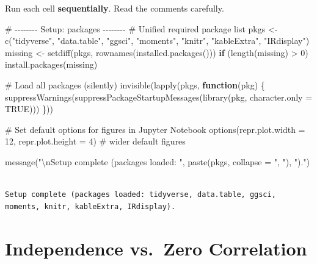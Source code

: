 \documentclass[
  12pt,
  a4paper,
]{scrbook}
\newenvironment{Shaded}{\begin{snugshade}}{\end{snugshade}}
\newcommand{\AttributeTok}[1]{\textcolor[rgb]{0.40,0.45,0.13}{#1}}
\newcommand{\CommentTok}[1]{\textcolor[rgb]{0.37,0.37,0.37}{#1}}
\newcommand{\ConstantTok}[1]{\textcolor[rgb]{0.56,0.35,0.01}{#1}}
\newcommand{\ControlFlowTok}[1]{\textcolor[rgb]{0.00,0.23,0.31}{\textbf{#1}}}
\newcommand{\DecValTok}[1]{\textcolor[rgb]{0.68,0.00,0.00}{#1}}
\newcommand{\FunctionTok}[1]{\textcolor[rgb]{0.28,0.35,0.67}{#1}}
\newcommand{\NormalTok}[1]{\textcolor[rgb]{0.00,0.23,0.31}{#1}}
\newcommand{\OtherTok}[1]{\textcolor[rgb]{0.00,0.23,0.31}{#1}}
\newcommand{\SpecialCharTok}[1]{\textcolor[rgb]{0.37,0.37,0.37}{#1}}
\newcommand{\StringTok}[1]{\textcolor[rgb]{0.13,0.47,0.30}{#1}}
\theoremstyle{plain}
\theoremstyle{definition}
\theoremstyle{remark}
\begin{document}
Run each cell \textbf{sequentially}. Read the comments carefully.

\begin{Shaded}
\begin{Highlighting}[]
\CommentTok{\# {-}{-}{-}{-}{-}{-}{-}{-} Setup: packages {-}{-}{-}{-}{-}{-}{-}{-}}
\CommentTok{\# Unified required package list}
\NormalTok{pkgs }\OtherTok{\textless{}{-}} \FunctionTok{c}\NormalTok{(}\StringTok{"tidyverse"}\NormalTok{, }\StringTok{"data.table"}\NormalTok{, }\StringTok{"ggsci"}\NormalTok{, }\StringTok{"moments"}\NormalTok{, }\StringTok{"knitr"}\NormalTok{, }\StringTok{"kableExtra"}\NormalTok{, }\StringTok{"IRdisplay"}\NormalTok{)}
\NormalTok{missing }\OtherTok{\textless{}{-}} \FunctionTok{setdiff}\NormalTok{(pkgs, }\FunctionTok{rownames}\NormalTok{(}\FunctionTok{installed.packages}\NormalTok{()))}
\ControlFlowTok{if}\NormalTok{ (}\FunctionTok{length}\NormalTok{(missing) }\SpecialCharTok{\textgreater{}} \DecValTok{0}\NormalTok{) }\FunctionTok{install.packages}\NormalTok{(missing)}

\CommentTok{\# Load all packages (silently)}
\FunctionTok{invisible}\NormalTok{(}\FunctionTok{lapply}\NormalTok{(pkgs, }\ControlFlowTok{function}\NormalTok{(pkg) \{}
  \FunctionTok{suppressWarnings}\NormalTok{(}\FunctionTok{suppressPackageStartupMessages}\NormalTok{(}\FunctionTok{library}\NormalTok{(pkg, }\AttributeTok{character.only =} \ConstantTok{TRUE}\NormalTok{)))}
\NormalTok{\}))}

\CommentTok{\# Set default options for figures in Jupyter Notebook}
\FunctionTok{options}\NormalTok{(}\AttributeTok{repr.plot.width =} \DecValTok{12}\NormalTok{, }\AttributeTok{repr.plot.height =} \DecValTok{4}\NormalTok{)  }\CommentTok{\# wider default figures}

\FunctionTok{message}\NormalTok{(}\StringTok{"}\SpecialCharTok{\textbackslash{}n}\StringTok{Setup complete (packages loaded: "}\NormalTok{, }\FunctionTok{paste}\NormalTok{(pkgs, }\AttributeTok{collapse =} \StringTok{", "}\NormalTok{), }\StringTok{")."}\NormalTok{)}
\end{Highlighting}
\end{Shaded}

\begin{verbatim}

Setup complete (packages loaded: tidyverse, data.table, ggsci, moments, knitr, kableExtra, IRdisplay).
\end{verbatim}

\section{Independence vs.~Zero
Correlation}\label{independence-vs.-zero-correlation}
\end{document}
